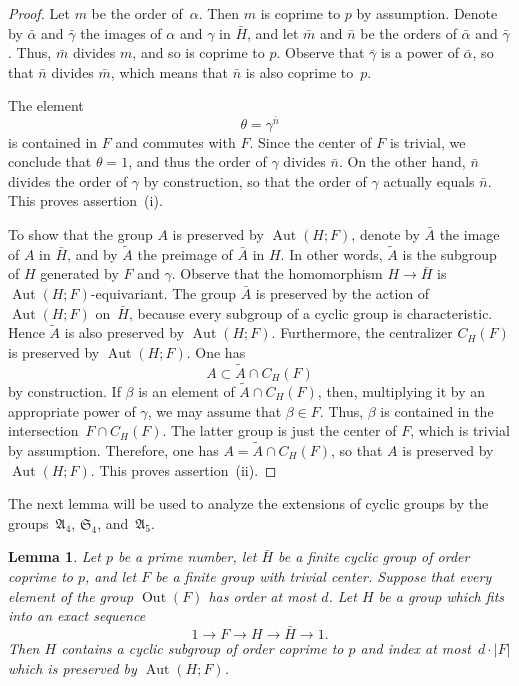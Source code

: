 \documentclass[12pt]{amsart}
\numberwithin{equation}{section}
\newtheorem{lemma}[subsection]{Lemma}
\theoremstyle{definition}
\DeclareMathOperator{\Aut}{Aut}
\DeclareMathOperator{\Out}{Out}
\begin{document}
\begin{proof}
Let $m$ be the order of~$\alpha$. Then $m$ is coprime to $p$ by assumption.
Denote by $\bar{\alpha}$ and $\bar{\gamma}$ the images of $\alpha$ and $\gamma$ in $\bar{H}$, and let $\bar{m}$ and $\bar{n}$ be the orders of $\bar{\alpha}$
and $\bar{\gamma}$. Thus, $\bar{m}$ divides $m$, and so is coprime to $p$. Observe that $\bar{\gamma}$ is a power of $\bar{\alpha}$, so that $\bar{n}$ divides $\bar{m}$, which
means that $\bar{n}$ is also coprime to~$p$.

The element
$$
\theta=\gamma^{\bar{n}}
$$
is contained in $F$ and commutes with $F$. Since the center of $F$ is trivial, we conclude that $\theta=1$, and thus the order of $\gamma$ divides
$\bar{n}$. On the other hand, $\bar{n}$ divides the order of $\gamma$ by construction,
so that the order of $\gamma$ actually equals $\bar{n}$. This proves assertion~(i).

To show that the group $A$ is preserved by $\Aut(H;F)$, denote by $\bar{A}$ the image of $A$ in $\bar{H}$, and by $\tilde{A}$
the preimage of $\bar{A}$ in $H$. In other words, $\tilde{A}$ is the subgroup
of $H$ generated by $F$ and $\gamma$. Observe that the homomorphism $H\to \bar{H}$
is $\Aut(H;F)$-equivariant. The group $\bar{A}$ is preserved by the
action of $\Aut(H;F)$ on~$\bar{H}$, because every subgroup of a cyclic group
is characteristic. Hence $\tilde{A}$ is also preserved by $\Aut(H;F)$.
Furthermore, the centralizer $C_H(F)$ is preserved by $\Aut(H;F)$. One has
$$
A\subset \tilde{A}\cap C_H(F)
$$
by construction. If $\beta$ is an element
of $\tilde{A}\cap C_H(F)$, then, multiplying it by an appropriate power of $\gamma$, we may assume
that $\beta\in F$. Thus, $\beta$ is contained in the intersection~\mbox{$F\cap C_H(F)$}. The latter group is
just the center of $F$, which is trivial by assumption.
Therefore, one has $A=\tilde{A}\cap C_H(F)$, so that $A$
is preserved by~\mbox{$\Aut(H;F)$}.
This proves assertion~(ii).
\end{proof}

The next lemma will be used to analyze the extensions of cyclic groups
by the groups~$\mathfrak{A}_4$, $\mathfrak{S}_4$, and~$\mathfrak{A}_5$.

\begin{lemma}\label{lemma:An-Sn-extension}
Let $p$ be a prime number, let $\bar{H}$ be a finite cyclic group of order coprime to $p$,
and let $F$ be a finite group with trivial center. Suppose that every element of the group
$\Out(F)$ has order at most $d$. Let $H$ be a group which fits into an exact sequence
$$
1\to F\to H\to \bar{H}\to 1.
$$
Then $H$ contains a cyclic subgroup of order coprime to $p$ and index at most~\mbox{$d\cdot |F|$}
which is preserved by $\Aut(H;F)$.
\end{lemma}
\end{document}
